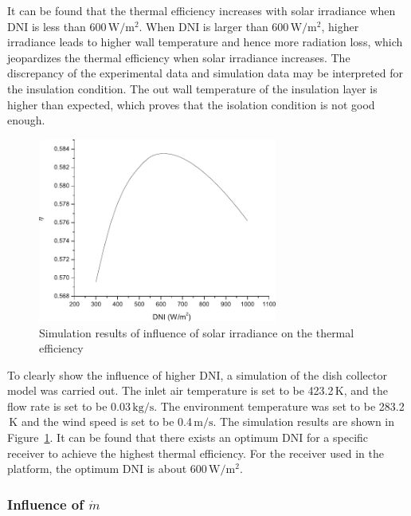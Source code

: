 It can be found that the thermal efficiency increases with solar irradiance when DNI is less than 600$\,\mathrm{W/m^2}$. When DNI is larger than 600$\,\mathrm{W/m^2}$, higher irradiance leads to higher wall temperature and hence more radiation loss, which jeopardizes the thermal efficiency when solar irradiance increases. 
The discrepancy of the experimental data and simulation data may be interpreted for the insulation condition. The out wall temperature of the insulation layer is higher than expected, which proves that the isolation condition is not good enough. 

\begin{figure}[!ht]
\centering
\includegraphics[width=0.7\textwidth]{fig/HigherDNI-eta-dish}
\caption{Simulation results of influence of solar irradiance on the thermal efficiency}
\label{fig:HigherDNI-eta-dish}
\end{figure}
To clearly show the influence of higher DNI, a simulation of the dish collector model was carried out. The inlet air temperature is set to be 423.2$\,\mathrm{K}$, and the flow rate is set to be 0.03$\,\mathrm{kg/s}$. The environment temperature was set to be 283.2$\,\mathrm{K}$ and the wind speed is set to be 0.4$\,\mathrm{m/s}$. The simulation results are shown in Figure~\ref{fig:HigherDNI-eta-dish}. It can be found that there exists an optimum DNI for a specific receiver to achieve the highest thermal efficiency. For the receiver used in the platform, the optimum DNI is about 600$\,\mathrm{W/m^2}$.


\subsubsection{Influence of $\dot{m}$}

